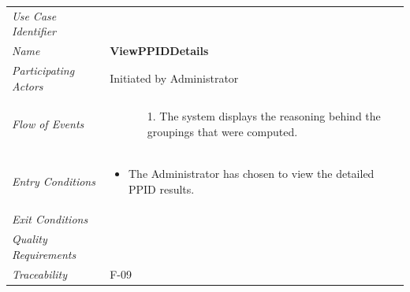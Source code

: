\documentclass[12pt,letterpaper]{article}
\begin{document}
\begin{center}
	\begin{tabu} to 
		\toprule
		Use Case Identifier & \viewppiddetails{} \\
		Name & {\bf ViewPPIDDetails} \\
		Participating Actors & Initiated by Administrator \\
		Flow of Events & 
	    \begin{enumerate}[topsep=-1em,leftmargin=*]
		    \item[]
		    \begin{enumerate}
		        \item[1.] The system displays the reasoning behind the groupings that were computed.
		    \end{enumerate}
		\end{enumerate} \\

		Entry Conditions &
		\begin{itemize}[topsep=-1em,leftmargin=*]
		    \item The Administrator has chosen to view the detailed PPID results.
        \end{itemize} \\

		Exit Conditions & \\

		Quality Requirements & \\

		Traceability & F-09 \\
		\toprule
	\end{tabu}
\end{center}
\end{document}
